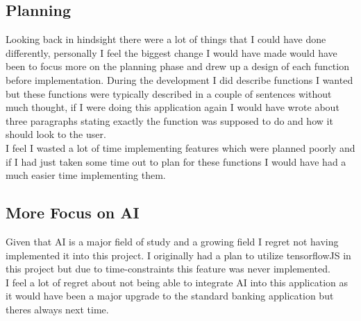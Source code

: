 \subsection{Planning}
Looking back in hindsight there were a lot of things that I could have done differently, personally I feel the biggest change I would have made would have been to focus more on the planning phase and drew up a design of each function before implementation.  During the development I did describe functions I wanted but these functions were typically described in a couple of sentences without much thought, if I were doing this application again I would have wrote about three paragraphs stating exactly the function was supposed to do and how it should look to the user.
\\
I feel I wasted a lot of time implementing features which were planned poorly and if I had just taken some time out to plan for these functions I would have had a much easier time implementing them.
\subsection{More Focus on AI}
Given that AI is a major field of study and a growing field I regret not having implemented it into this project.  I originally had a plan to utilize tensorflowJS in this project but due to time-constraints this feature was never implemented.
\\
I feel a lot of regret about not being able to integrate AI into this application as it would have been a major upgrade to the standard banking application but theres always next time.
